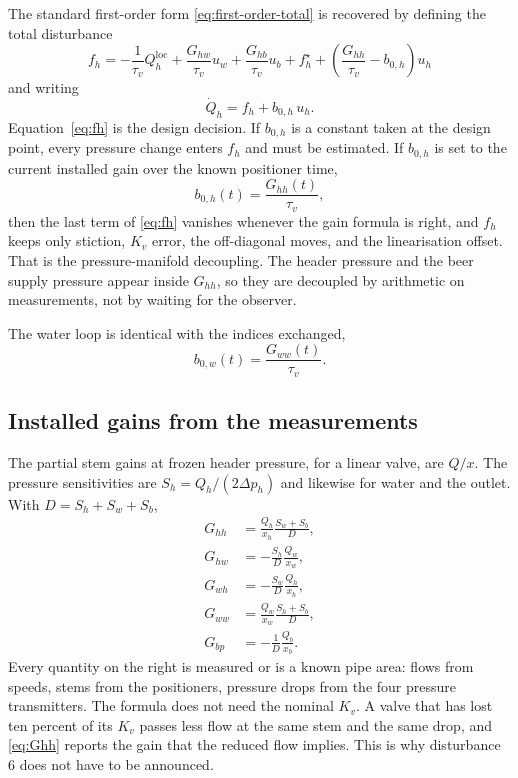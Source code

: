 The standard first-order form \eqref{eq:first-order-total} is recovered by defining the total disturbance
\begin{equation}
\label{eq:fh}
f_h = -\frac{1}{\tau_v}Q_h^{\mathrm{loc}} + \frac{G_{hw}}{\tau_v} u_w + \frac{G_{hb}}{\tau_v} u_b + f_h^\star + \left(\frac{G_{hh}}{\tau_v} - b_{0,h}\right) u_h
\end{equation}
and writing
\begin{equation}
\label{eq:beer-adrc-plant}
\dot{Q}_h = f_h + b_{0,h}\, u_h.
\end{equation}
Equation~\eqref{eq:fh} is the design decision. If $b_{0,h}$ is a constant taken at the design point, every pressure change enters $f_h$ and must be estimated. If $b_{0,h}$ is set to the current installed gain over the known positioner time,
\begin{equation}
\label{eq:b0h}
b_{0,h}(t) = \frac{G_{hh}(t)}{\tau_v},
\end{equation}
then the last term of \eqref{eq:fh} vanishes whenever the gain formula is right, and $f_h$ keeps only stiction, $K_v$ error, the off-diagonal moves, and the linearisation offset. That is the pressure-manifold decoupling. The header pressure and the beer supply pressure appear inside $G_{hh}$, so they are decoupled by arithmetic on measurements, not by waiting for the observer.

The water loop is identical with the indices exchanged,
\begin{equation}
\label{eq:b0w}
b_{0,w}(t) = \frac{G_{ww}(t)}{\tau_v}.
\end{equation}

\subsection{Installed gains from the measurements}

The partial stem gains at frozen header pressure, for a linear valve, are $Q/x$. The pressure sensitivities are $S_h = Q_h/(2\Delta p_h)$ and likewise for water and the outlet. With $D = S_h+S_w+S_b$,
\begin{align}
G_{hh} &= \frac{Q_h}{x_h}\frac{S_w+S_b}{D}, \label{eq:Ghh}\\
G_{hw} &= -\frac{S_h}{D}\frac{Q_w}{x_w}, \label{eq:Ghw}\\
G_{wh} &= -\frac{S_w}{D}\frac{Q_h}{x_h}, \label{eq:Gwh}\\
G_{ww} &= \frac{Q_w}{x_w}\frac{S_h+S_b}{D}, \label{eq:Gww}\\
G_{bp} &= -\frac{1}{D}\frac{Q_b}{x_b}. \label{eq:Gbp}
\end{align}
Every quantity on the right is measured or is a known pipe area: flows from speeds, stems from the positioners, pressure drops from the four pressure transmitters. The formula does not need the nominal $K_v$. A valve that has lost ten percent of its $K_v$ passes less flow at the same stem and the same drop, and \eqref{eq:Ghh} reports the gain that the reduced flow implies. This is why disturbance 6 does not have to be announced.

